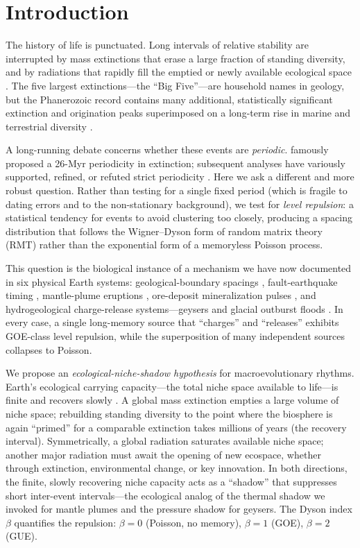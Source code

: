 \documentclass[12pt,a4paper]{article}
\begin{document}
\section{Introduction}

The history of life is punctuated. Long intervals of relative stability are interrupted by mass extinctions that erase a large fraction of standing diversity, and by radiations that rapidly fill the emptied or newly available ecological space \citep{raup1982,sepkoski1984,bambach2006}. The five largest extinctions---the ``Big Five''---are household names in geology, but the Phanerozoic record contains many additional, statistically significant extinction and origination peaks superimposed on a long-term rise in marine and terrestrial diversity \citep{bambach2006,alroy2008}.

A long-running debate concerns whether these events are \emph{periodic}. \citet{raup1984} famously proposed a 26-Myr periodicity in extinction; subsequent analyses have variously supported, refined, or refuted strict periodicity \citep{melott2010}. Here we ask a different and more robust question. Rather than testing for a single fixed period (which is fragile to dating errors and to the non-stationary background), we test for \emph{level repulsion}: a statistical tendency for events to avoid clustering too closely, producing a spacing distribution that follows the Wigner--Dyson form of random matrix theory (RMT) rather than the exponential form of a memoryless Poisson process.

This question is the biological instance of a mechanism we have now documented in six physical Earth systems: geological-boundary spacings \citep{chen2026geo}, fault-earthquake timing \citep{chen2026fault}, mantle-plume eruptions \citep{chen2026plume}, ore-deposit mineralization pulses \citep{chen2026metal}, and hydrogeological charge-release systems---geysers and glacial outburst floods \citep{chen2026hydro}. In every case, a single long-memory source that ``charges'' and ``releases'' exhibits GOE-class level repulsion, while the superposition of many independent sources collapses to Poisson.

We propose an \emph{ecological-niche-shadow hypothesis} for macroevolutionary rhythms. Earth's ecological carrying capacity---the total niche space available to life---is finite and recovers slowly \citep{sepkoski1984,erwin1998}. A global mass extinction empties a large volume of niche space; rebuilding standing diversity to the point where the biosphere is again ``primed'' for a comparable extinction takes millions of years (the recovery interval). Symmetrically, a global radiation saturates available niche space; another major radiation must await the opening of new ecospace, whether through extinction, environmental change, or key innovation. In both directions, the finite, slowly recovering niche capacity acts as a ``shadow'' that suppresses short inter-event intervals---the ecological analog of the thermal shadow we invoked for mantle plumes and the pressure shadow for geysers. The Dyson index $\beta$ quantifies the repulsion: $\beta=0$ (Poisson, no memory), $\beta=1$ (GOE), $\beta=2$ (GUE).
\end{document}
